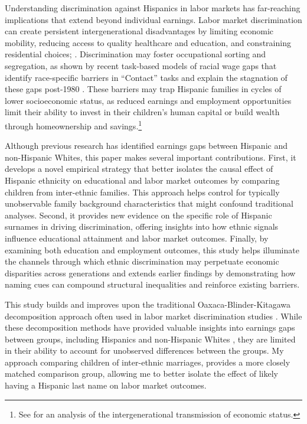 Understanding discrimination against Hispanics in labor markets has far-reaching implications that extend beyond individual earnings. Labor market discrimination can create persistent intergenerational disadvantages by limiting economic mobility, reducing access to quality healthcare and education, and constraining residential choices; \autocite{chettyUnitedStatesStill2014, chettyEffectsExposureBetter2016,chettyFadingAmericanDream2017,bowles2002inheritance, djajic2003assimilation}. Discrimination may foster occupational sorting and segregation, as shown by recent task-based models of racial wage gaps that identify race-specific barriers in “Contact” tasks and explain the stagnation of these gaps post-1980 \autocite{hurst2024task}. These barriers may trap Hispanic families in cycles of lower socioeconomic status, as reduced earnings and employment opportunities limit their ability to invest in their children's human capital or build wealth through homeownership and savings.\footnote{See \textcite{bowles2002inheritance} for an analysis of the intergenerational transmission of economic status.} 

Although previous research has identified earnings gaps between Hispanic and non-Hispanic Whites, this paper makes several important contributions. First, it develops a novel empirical strategy that better isolates the causal effect of Hispanic ethnicity on educational and labor market outcomes by comparing children from inter-ethnic families. This approach helps control for typically unobservable family background characteristics that might confound traditional analyses. Second, it provides new evidence on the specific role of Hispanic surnames in driving discrimination, offering insights into how ethnic signals influence educational attainment and labor market outcomes. Finally, by examining both education and employment outcomes, this study helps illuminate the channels through which ethnic discrimination may perpetuate economic disparities across generations and extends earlier findings by demonstrating how naming cues can compound structural inequalities and reinforce existing barriers.

This study builds and improves upon the traditional Oaxaca-Blinder-Kitagawa decomposition approach often used in labor market discrimination studies \autocite{kitagawa1955components, oaxaca1973male,blinder1973wage}. While these decomposition methods have provided valuable insights into earnings gaps between groups, including Hispanics and non-Hispanic Whites \autocite{davilaChangesRelativeEarnings2008}, they are limited in their ability to account for unobserved differences between the groups. My approach comparing children of inter-ethnic marriages, provides a more closely matched comparison group, allowing me to better isolate the effect of likely having a Hispanic last name on labor market outcomes.

